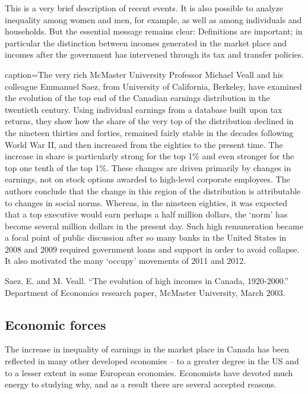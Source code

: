 \newhtmlpage

This is a very brief description of recent events. It is also possible to
analyze inequality among women and men, for example, as well as among
individuals and households. But the essential message remains clear:
Definitions are important; in particular the distinction between incomes
generated in the market place and incomes after the government has
intervened through its tax and transfer policies.

\begin{ApplicationBox}{caption={The very rich \label{app:veryrich}}}
	McMaster University Professor Michael Veall and his colleague Emmanuel Saez, from University of California, Berkeley, have examined the evolution of the top end of the Canadian earnings distribution in the twentieth century. Using individual earnings from a database built upon tax returns, they show how the share of the very top of the distribution declined in the nineteen thirties and forties, remained fairly stable in the decades following World War II, and then increased from the eighties to the present time. The increase in share is particularly strong for the top 1\% and even stronger for the top one tenth of the top 1\%. These changes are driven primarily by changes in earnings, not on stock options awarded to high-level corporate employees. The authors conclude that the change in this region of the distribution is attributable to changes in social norms. Whereas, in the nineteen eighties, it was expected that a top executive would earn perhaps a half million dollars, the `norm' has become several million dollars in the present day. Such high remuneration became a focal point of public discussion after so many banks in the United States in 2008 and 2009 required government loans and support in order to avoid collapse. It also motivated the many `occupy' movements of 2011 and 2012.

	Saez, E. and M. Veall. ``The evolution of high incomes in Canada, 1920-2000.'' Department of Economics research paper, McMaster University, March 2003.
\end{ApplicationBox}

\newhtmlpage

\subsection*{Economic forces}

The increase in inequality of earnings in the market place in Canada has
been reflected in many other developed economies -- to a greater degree in
the US and to a lesser extent in some European economies. Economists have
devoted much energy to studying why, and as a result there are several
accepted reasons.

